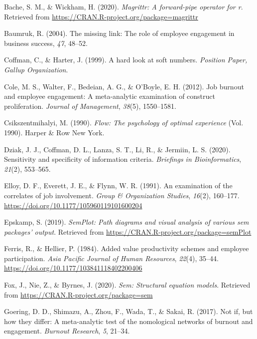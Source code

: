 \documentclass[
  english,
  man]{apa6}
\begin{document}
\leavevmode\hypertarget{ref-R-magrittr}{}%
Bache, S. M., \& Wickham, H. (2020). \emph{Magrittr: A forward-pipe operator for r}. Retrieved from \url{https://CRAN.R-project.org/package=magrittr}

\leavevmode\hypertarget{ref-baumruk2004missing}{}%
Baumruk, R. (2004). The missing link: The role of employee engagement in business success, \emph{47}, 48--52.

\leavevmode\hypertarget{ref-coffman_hard_1999}{}%
Coffman, C., \& Harter, J. (1999). A hard look at soft numbers. \emph{Position Paper, Gallup Organization}.

\leavevmode\hypertarget{ref-cole2012job}{}%
Cole, M. S., Walter, F., Bedeian, A. G., \& O'Boyle, E. H. (2012). Job burnout and employee engagement: A meta-analytic examination of construct proliferation. \emph{Journal of Management}, \emph{38}(5), 1550--1581.

\leavevmode\hypertarget{ref-csikszentmihalyi1990flow}{}%
Csikszentmihalyi, M. (1990). \emph{Flow: The psychology of optimal experience} (Vol. 1990). Harper \& Row New York.

\leavevmode\hypertarget{ref-dziak2020sensitivity}{}%
Dziak, J. J., Coffman, D. L., Lanza, S. T., Li, R., \& Jermiin, L. S. (2020). Sensitivity and specificity of information criteria. \emph{Briefings in Bioinformatics}, \emph{21}(2), 553--565.

\leavevmode\hypertarget{ref-elloy_examination_1991}{}%
Elloy, D. F., Everett, J. E., \& Flynn, W. R. (1991). An examination of the correlates of job involvement. \emph{Group \& Organization Studies}, \emph{16}(2), 160--177. \url{https://doi.org/10.1177/105960119101600204}

\leavevmode\hypertarget{ref-R-semPlot}{}%
Epskamp, S. (2019). \emph{SemPlot: Path diagrams and visual analysis of various sem packages' output}. Retrieved from \url{https://CRAN.R-project.org/package=semPlot}

\leavevmode\hypertarget{ref-ferris_added_1984}{}%
Ferris, R., \& Hellier, P. (1984). Added value productivity schemes and employee participation. \emph{Asia Pacific Journal of Human Resources}, \emph{22}(4), 35--44. \url{https://doi.org/10.1177/103841118402200406}

\leavevmode\hypertarget{ref-R-sem}{}%
Fox, J., Nie, Z., \& Byrnes, J. (2020). \emph{Sem: Structural equation models}. Retrieved from \url{https://CRAN.R-project.org/package=sem}

\leavevmode\hypertarget{ref-goering2017not}{}%
Goering, D. D., Shimazu, A., Zhou, F., Wada, T., \& Sakai, R. (2017). Not if, but how they differ: A meta-analytic test of the nomological networks of burnout and engagement. \emph{Burnout Research}, \emph{5}, 21--34.
\end{document}
